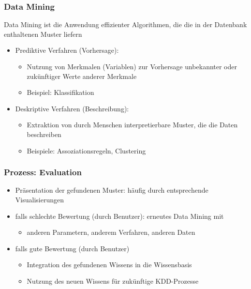 

\begin{frame}
  \frametitle{Data Mining}

  \begin{notebox}
  Data Mining ist die Anwendung effizienter Algorithmen, die die
    in der Datenbank enthaltenen Muster liefern
  \end{notebox}

  \begin{itemize}
  \item Prediktive Verfahren (Vorhersage):
  \begin{itemize}
  \item Nutzung von Merkmalen (Variablen) zur Vorhersage unbekannter
    oder zukünftiger Werte anderer Merkmale
  \item Beispiel: Klassifikation
  \end{itemize}
  \item Deskriptive Verfahren (Beschreibung):
  \begin{itemize}
  \item Extraktion von durch Menschen interpretierbare Muster, die die
    Daten beschreiben
  \item Beispiele: Assoziationsregeln, Clustering
  \end{itemize}
  \end{itemize}

  \end{frame}



\begin{frame}
\frametitle{Prozess: Evaluation}

\begin{itemize}
\item Präsentation der gefundenen Muster: häufig durch entsprechende
  Visualisierungen
\item falls schlechte Bewertung (durch Benutzer): erneutes Data Mining mit
\begin{itemize}
\item anderen Parametern, anderem Verfahren, anderen Daten
\end{itemize}
\item falls gute Bewertung (durch Benutzer)
\begin{itemize}
\item Integration des gefundenen Wissens in die Wissensbasis
\item Nutzung des neuen Wissens für zukünftige KDD-Prozesse
\end{itemize}
\end{itemize}

\end{frame}

